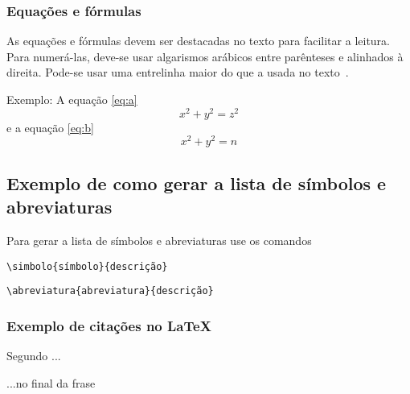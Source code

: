 \subsubsection{Equações e fórmulas}

As equações e fórmulas
devem ser destacadas no texto
para facilitar a leitura.
Para numerá-las,
deve-se usar algarismos arábicos entre parênteses
e alinhados à direita.
Pode-se usar uma entrelinha maior do que a usada no texto~\cite{abnt14724}.

Exemplo: A equação \ref{eq:a}
\begin{equation}
    x^2 + y^2 = z^2
    \label{eq:a}
\end{equation}
 e a equação \ref{eq:b}
\begin{equation}
    x^2 + y^2 = n
    \label{eq:b}
\end{equation}

\subsection{Exemplo de como gerar a lista de símbolos e abreviaturas}

Para gerar a lista de símbolos e abreviaturas use os comandos


\begin{lstlisting}
\simbolo{símbolo}{descrição}
\end{lstlisting}

\begin{lstlisting}
\abreviatura{abreviatura}{descrição}
\end{lstlisting}

\subsubsection{Exemplo de citações no \LaTeX}

Segundo  ...

...no final da frase \cite{abnt14724,BU_formatoA5}

\nocite{alves_2001,abnt10520,abnt6024,abnt14724}
